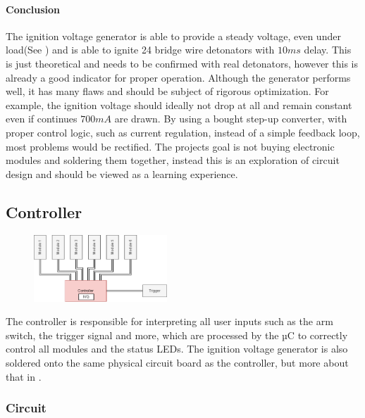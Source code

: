 \paragraph{Conclusion}
The ignition voltage generator is able to provide a steady voltage, even under load(See ) and is able to ignite 24 bridge wire detonators with $10ms$ delay. This is just theoretical and needs to be confirmed with real detonators, however this is already a good indicator for proper operation. Although the generator performs well, it has many flaws and should be subject of rigorous optimization. For example, the ignition voltage should ideally not drop at all and remain constant even if continues $700mA$ are drawn. By using a bought step-up converter, with proper control logic, such as current regulation, instead of a simple feedback loop, most problems would be rectified. The projects goal is not buying electronic modules and soldering them together, instead this is an exploration of circuit design and should be viewed as a learning experience.


\pagebreak


\subsection{Controller}
\label{Controller}

\begin{figure}[!ht]
    \centering
    \includegraphics[width=5cm]{./Figures/concept_controller.png} 
\end{figure}

\noindent The controller is responsible for interpreting all user inputs such as the arm switch, the trigger signal and more, which are processed by the µC to correctly control all modules and the status LEDs. The ignition voltage generator is also soldered onto the same physical circuit board as the controller, but more about that in .

\subsubsection{Circuit}

